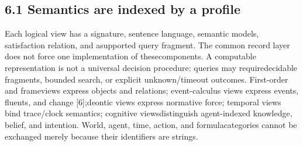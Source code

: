\subsection*{6.1  Semantics are indexed by a profile}
\noindent
Each logical view has a signature, sentence language, semantic models, satisfaction relation, and a\linebreak[4]
supported query fragment. The common record layer does not force one implementation of these\linebreak[4]
components. A computable representation is not a universal decision procedure: queries may require\linebreak[4]
decidable fragments, bounded search, or explicit unknown/timeout outcomes. First-order and frame\linebreak[4]
views express objects and relations; event-calculus views express events, fluents, and change [6];\linebreak[4]
deontic views express normative force; temporal views bind trace/clock semantics; cognitive views\linebreak[4]
distinguish agent-indexed knowledge, belief, and intention. World, agent, time, action, and formula\linebreak[4]
categories cannot be exchanged merely because their identifiers are strings.\par

